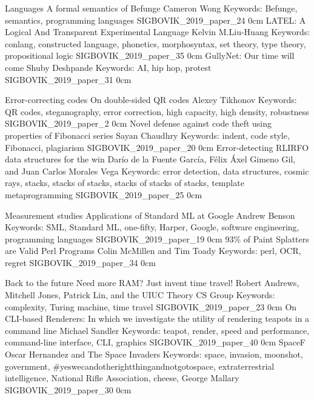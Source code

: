 \addtrack
	{}{Languages}
\addpaper
	{A formal semantics of Befunge}
	{Cameron Wong}
	{Keywords: Befunge, semantics, programming languages}
	{SIGBOVIK_2019_paper_24}
	{0cm}
	{}
\addpaper
	{LATEL: A Logical And Transparent Experimental Language}
	{Kelvin M.\@ Liu-Huang}
	{Keywords: conlang, constructed language, phonetics, morphosyntax, set theory, type theory, propositional logic}
	{SIGBOVIK_2019_paper_35}
	{0cm}
	{}
\addpaper
	{GullyNet: Our time will come}
	{Shuby Deshpande}
	{Keywords: AI, hip hop, protest}
	{SIGBOVIK_2019_paper_31}
	{0cm}
	{}

\addtrack
	{}{Error-correcting codes}
\addpaper
	{On double-sided QR codes}
	{Alexey Tikhonov}
	{Keywords: QR codes, steganography, error correction, high capacity, high density, robustness}
	{SIGBOVIK_2019_paper_2}
	{0cm}
	{}
\addpaper
	{Novel defense against code theft using properties of Fibonacci series}
	{Sayan Chaudhry}
	{Keywords: indent, code style, Fibonacci, plagiarism}
	{SIGBOVIK_2019_paper_20}
	{0cm}
	{}
\addpaper
	{Error-detecting RLIRFO data structures for the win}
	{Darío de la Fuente García, Félix Áxel Gimeno Gil, and Juan Carlos Morales Vega}
	{Keywords: error detection, data structures, cosmic rays, stacks, stacks of stacks, stacks of stacks of stacks, template metaprogramming}
	{SIGBOVIK_2019_paper_25}
	{0cm}
	{}

\addtrack
	{}{Measurement studies}
\addpaper
	{Applications of Standard ML at Google}
	{Andrew Benson}
	{Keywords: SML, Standard ML, one-fifty, Harper, Google, software engineering, programming languages}
	{SIGBOVIK_2019_paper_19}
	{0cm}
	{}
\addpaper
	{93\% of Paint Splatters are Valid Perl Programs}
	{Colin McMillen and Tim Toady}
	{Keywords: perl, OCR, regret}
	{SIGBOVIK_2019_paper_34}
	{0cm}
	{}

\addtrack
	{}{Back to the future}
\addpaper
	{Need more RAM? Just invent time travel!}
	{Robert Andrews, Mitchell Jones, Patrick Lin, and the UIUC Theory CS Group}
	{Keywords: complexity, Turing machine, time travel}
	{SIGBOVIK_2019_paper_23}
	{0cm}
	{}
\addpaper
	{On CLI-based Renderers: In which we investigate the utility of rendering teapots in a command line}
	{Michael Sandler}
	{Keywords: teapot, render, speed and performance, command-line interface, CLI, graphics}
	{SIGBOVIK_2019_paper_40}
	{0cm}
	{}
\addpaper
	{SpaceF}
	{Oscar Hernandez and The Space Invaders}
	{Keywords: space, invasion, moonshot, government, \#yeswecandotherightthingandnotgotospace, extraterrestrial intelligence, National Rifle Association, cheese, George Mallary}
	{SIGBOVIK_2019_paper_30}
	{0cm}
	{}

